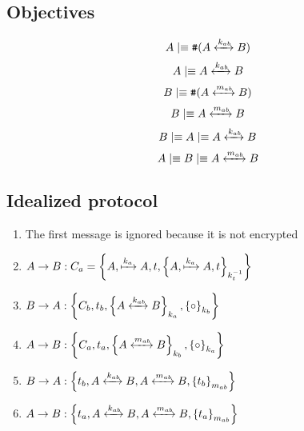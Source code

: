 \documentclass[twocolumn]{article}
\newcommand{\believes}{\mid\equiv}
\newcommand{\fresh}[1]{\text{\texttt{\#}}(#1)}
\newcommand{\sharekey}[1]{\xleftrightarrow{#1}}
\newcommand{\pubkey}[1]{\xmapsto{#1}}
\begin{document}
\subsection {Objectives}
\setcounter{equation}{0}
\renewcommand{\theequation}{O.\arabic{equation}}
\begin{equation} \label{Ob:O.1} %
A \believes \fresh{A \sharekey{k_{ab}} B}
\end{equation}
\begin{equation}  \label{Ob:O.2}%
A \believes A \sharekey{k_{ab}} B
\end{equation}
\begin{equation} \label{Ob:O.3}%
B \believes \fresh{A \sharekey{m_{ab}} B}
\end{equation}
\begin{equation} \label{Ob:O.4} %
B \believes A \sharekey{m_{ab}} B
\end{equation}
\begin{equation} \label{Ob:O.5} %
B \believes A \believes A \sharekey{k_{ab}} B
\end{equation}
\begin{equation} \label{Ob:O.6} %
A \believes B \believes A \sharekey{m_{ab}} B
\end{equation}

\subsection{Idealized protocol}
\begin{enumerate}[label=\textbf{M\arabic*}]
\item The first message is ignored because it is not encrypted
\item $A \rightarrow B: C_a=\left \{  A,\pubkey{k_a}A,t,\left \{A,\pubkey{k_a}A,t\right \}_{k_t^{-1}} \right \}$
\item $B \rightarrow A: \left \{  C_b,t_b,\left \{A \sharekey{k_{ab}} B\right \}_{k_a} ,\left \{ \circ \right \}_{k_b} \right \}$
\item $A \rightarrow B: \left \{  C_a,t_a,\left \{A \sharekey{m_{ab}} B\right \}_{k_b} ,\left \{ \circ \right \}_{k_a} \right \}$
\item $B \rightarrow A: \left \{  t_b,A \sharekey{k_{ab}} B,A\sharekey{m_{ab}}B,\left \{ t_b \right \}_{m_{ab}} \right \}$
\item $A \rightarrow B: \left \{  t_a,A \sharekey{k_{ab}} B,A\sharekey{m_{ab}}B,\left \{ t_a \right \}_{m_{ab}} \right \}$
\end{enumerate}
\end{document}
